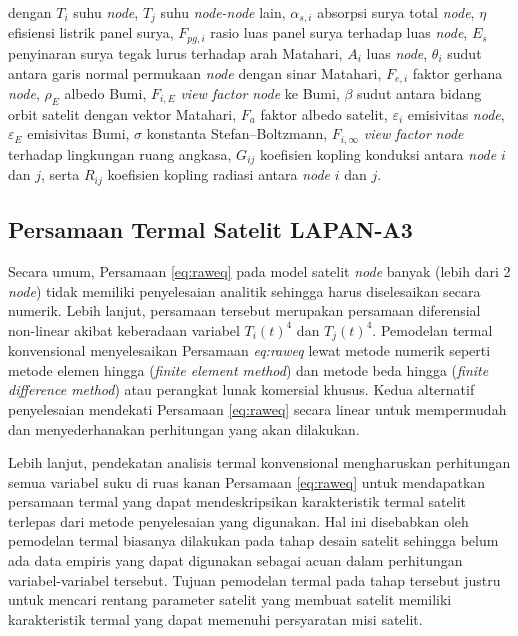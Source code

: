 dengan $T_i$ suhu \textit{node}, $T_j$ suhu \textit{node-node} lain,
$\alpha_{s,i}$ absorpsi surya total \textit{node}, $\eta$ efisiensi listrik panel surya,
$F_{pg,i}$ rasio luas panel surya terhadap luas \textit{node}, $E_s$ penyinaran surya
tegak lurus terhadap arah Matahari, $A_i$ luas \textit{node}, $\theta_i$ sudut antara
garis normal permukaan \textit{node} dengan sinar Matahari, $F_{e,i}$ faktor gerhana
\textit{node}, $\rho_E$ albedo Bumi, $F_{i,E}$ \textit{view factor} \textit{node} ke Bumi, $\beta$ sudut
antara bidang orbit satelit dengan vektor Matahari, $F_a$ faktor albedo
satelit, $\varepsilon_i$ emisivitas \textit{node}, $\varepsilon_E$ emisivitas Bumi, $\sigma$
konstanta Stefan–Boltzmann, $F_{i,\infty}$ \textit{view factor} \textit{node} terhadap
lingkungan ruang angkasa, $G_{ij}$ koefisien kopling konduksi antara \textit{node} $i$
dan $j$, serta $R_{ij}$ koefisien kopling radiasi antara \textit{node} $i$ dan $j$.

\subsection{Persamaan Termal Satelit LAPAN-A3}

Secara umum, Persamaan \ref{eq:raweq} pada model satelit \textit{node} banyak
(lebih dari 2 \textit{node}) tidak memiliki penyelesaian analitik sehingga
harus diselesaikan secara numerik. Lebih lanjut, persamaan tersebut merupakan
persamaan diferensial non-linear akibat keberadaan variabel $T_{i}(t)^4$ dan
$T_{j}(t)^4$. Pemodelan termal konvensional menyelesaikan Persamaan
\textit{eq:raweq} lewat metode numerik seperti metode elemen hingga
(\textit{finite element method}) dan metode beda hingga (\textit{finite
difference method}) atau perangkat lunak komersial khusus. Kedua alternatif
penyelesaian mendekati Persamaan \ref{eq:raweq} secara linear untuk mempermudah
dan menyederhanakan perhitungan yang akan dilakukan.

Lebih lanjut, pendekatan analisis termal konvensional mengharuskan perhitungan
semua variabel suku di ruas kanan Persamaan \ref{eq:raweq} untuk mendapatkan
persamaan termal yang dapat mendeskripsikan karakteristik termal satelit
terlepas dari metode penyelesaian yang digunakan. Hal ini disebabkan oleh
pemodelan termal biasanya dilakukan pada tahap desain satelit sehingga belum
ada data empiris yang dapat digunakan sebagai acuan dalam perhitungan
variabel-variabel tersebut. Tujuan pemodelan termal pada tahap tersebut justru
untuk mencari rentang parameter satelit yang membuat satelit memiliki
karakteristik termal yang dapat memenuhi persyaratan misi satelit.

